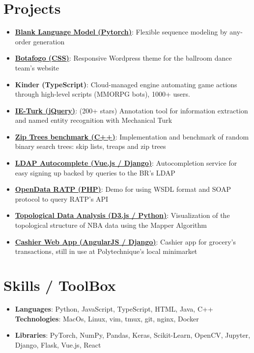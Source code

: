 \documentclass[letterpaper,10pt]{article}
\newcommand{\resumeItem}[2]{
  \item\small{
    \textbf{#1}{: #2 \vspace{-2pt}}
  }
}
\newcommand{\resumeSubItem}[2]{\resumeItem{#1}{#2}\vspace{-4pt}}
\newcommand{\resumeSubHeadingListStart}{\begin{itemize}[leftmargin=*]}
\newcommand{\resumeSubHeadingListEnd}{\end{itemize}}
\newcommand{\shorterSection}[1]{\vspace{-10pt}\section{#1}}
\begin{document}
\shorterSection{Projects}
  \resumeSubHeadingListStart
  \resumeSubItem{\href{https://github.com/varal7/blank_language_model}{\faGithub\hspace{0.5em}Blank Language Model (Pytorch)}} {Flexible sequence modeling by any-order generation}
  \resumeSubItem{\href{https://github.com/varal7/botafogo}{\faGithub\hspace{0.5em}Botafogo (CSS)}} {Responsive Wordpress theme for the ballroom dance team's website}
  \resumeSubItem{Kinder (TypeScript)} {Cloud-managed engine automating game actions through high-level scripts (MMORPG bots), 1000+ users.}
  \resumeSubItem{\href{https://github.com/varal7/ieturk}{\faGithub\hspace{0.5em}IE-Turk (jQuery)}} { (200+ stars) Annotation tool for information extraction and named entity recognition with Mechanical Turk}
  \resumeSubItem{\href{https://github.com/varal7/random_bst}{\faGithub\hspace{0.5em}Zip Trees benchmark (C++)}}{Implementation and benchmark of random binary search trees: skip lists, treaps and zip trees}
  \resumeSubItem{\href{https://github.com/varal7/autocomplete.bin}{\faGithub\hspace{0.5em}LDAP Autocomplete (Vue.js / Django)}}{Autocompletion service for easy signing up backed by queries to the BR's LDAP}
  \resumeSubItem{\href{https://github.com/varal7/opendata-ratp}{\faGithub\hspace{0.5em}OpenData RATP (PHP)}}{Demo for using WSDL format and SOAP protocol to query RATP's API}
  \resumeSubItem{\href{https://github.com/varal7/projet-aaa}{\faGithub\hspace{0.5em}Topological Data Analysis (D3.js / Python)}}{Visualization of the topological structure of NBA data using the Mapper Algorithm}
  \resumeSubItem{\href{https://github.com/BinetReseau/superette-khube}{\faGithub\hspace{0.5em}Cashier Web App (AngularJS / Django)}}{Cashier app for grocery's transactions, still in use at Polytechnique's local minimarket}
  \resumeSubHeadingListEnd

\shorterSection{Skills / ToolBox}
  \resumeSubHeadingListStart
  \small
    \item{
     \textbf{Languages}{: Python, JavaScript, TypeScript, HTML, Java, C++}
     \hfill
     \textbf{Technologies}{: MacOs, Linux, vim, tmux, git, nginx, Docker}
    }
    \vspace{-5pt}
    \item{
     \textbf{Libraries}{: PyTorch, NumPy, Pandas, Keras, Scikit-Learn, OpenCV, Jupyter, Django, Flask, Vue.js, React}
    }
\resumeSubHeadingListEnd
\end{document}
